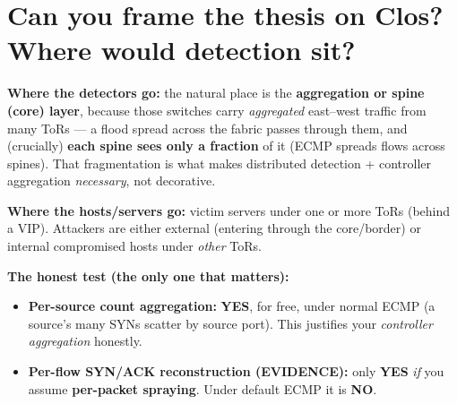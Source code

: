 \documentclass[11pt]{article}
\newcommand{\yes}{\textcolor{good}{\textbf{YES}}}
\newcommand{\no}{\textcolor{bad}{\textbf{NO}}}
\begin{document}
\section{Can you frame the thesis on Clos? Where would detection sit?}
\textbf{Where the detectors go:} the natural place is the \textbf{aggregation or spine (core) layer},
because those switches carry \emph{aggregated} east--west traffic from many ToRs --- a flood spread across
the fabric passes through them, and (crucially) \textbf{each spine sees only a fraction} of it (ECMP
spreads flows across spines). That fragmentation is what makes distributed detection + controller
aggregation \emph{necessary}, not decorative.

\textbf{Where the hosts/servers go:} victim servers under one or more ToRs (behind a VIP). Attackers are
either external (entering through the core/border) or internal compromised hosts under \emph{other} ToRs.

\textbf{The honest test (the only one that matters):}
\begin{center}\end{center}
\begin{itemize}[leftmargin=1.4em]
  \item \textbf{Per-source count aggregation:} \yes{}, for free, under normal ECMP (a source's many SYNs
  scatter by source port). This justifies your \emph{controller aggregation} honestly.
  \item \textbf{Per-flow SYN/ACK reconstruction (EVIDENCE):} only \yes{} \emph{if} you assume
  \textbf{per-packet spraying}. Under default ECMP it is \no{}.
\end{itemize}
\end{document}
